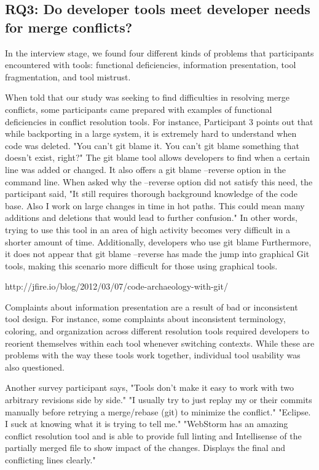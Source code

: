 \subsection{RQ3: Do developer tools meet developer needs for merge conflicts?}\label{RQ3}

In the interview stage, we found four different kinds of problems that participants encountered with tools: functional deficiencies, information presentation, tool fragmentation, and tool mistrust. 


When told that our study was seeking to find difficulties in resolving merge conflicts, some participants came prepared with examples of functional deficiencies in conflict resolution tools. For instance, Participant 3 points out that while backporting in a large system, it is extremely hard to understand when code was deleted. "You can't git blame it. You can't git blame something that doesn't exist, right?" 
The git blame tool allows developers to find when a certain line was added or changed. It also offers a git blame --reverse option in the command line. When asked why the --reverse option did not satisfy this need, the participant said, "It still requires thorough background knowledge of the code base. Also I work on large changes in time in hot paths. This could mean many additions and deletions that would lead to further confusion." In other words, trying to use this tool in an area of high activity becomes very difficult in a shorter amount of time. Additionally, developers who use git blame Furthermore, it does not appear that git blame --reverse has made the jump into graphical Git tools, making this scenario more difficult for those using graphical tools.


http://jfire.io/blog/2012/03/07/code-archaeology-with-git/


Complaints about information presentation are a result of bad or inconsistent tool design. For instance, some complaints about inconsistent terminology, coloring, and organization across different resolution tools required developers to reorient themselves within each tool whenever switching contexts. While these are problems with the way these tools work together, individual tool usability was also questioned.

Another survey participant says, "Tools don't make it easy to work with two arbitrary revisions side by side."
"I usually try to just replay my or their commits manually before retrying a merge/rebase (git) to minimize the conflict."
"Eclipse. I suck at knowing what it is trying to tell me."
"WebStorm has an amazing conflict resolution tool and is able to provide full linting and Intellisense of the partially merged file to show impact of the changes. Displays the final and conflicting lines clearly."

